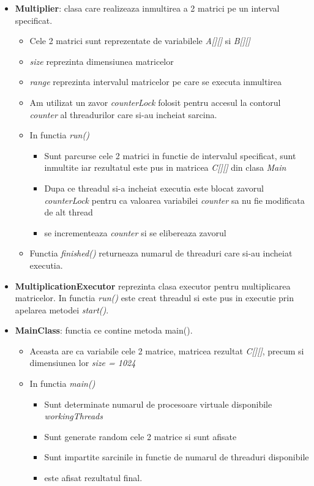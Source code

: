 \documentclass{article}
\begin{document}
\begin{itemize}
    \item \textbf{Multiplier}: clasa care realizeaza inmultirea a 2 matrici pe un interval specificat.
        \begin{itemize}
            \item Cele 2 matrici sunt reprezentate de variabilele \textit{A[][]} si \textit{B[][]} \item \textit{size} reprezinta dimensiunea matricelor
            \item \textit{range} reprezinta intervalul matricelor pe care se executa inmultirea
            \item Am utilizat un zavor \textit{counterLock} folosit pentru accesul la contorul \textit{counter} al threadurilor care si-au incheiat sarcina.
            \item In functia \textit{run()} 
            \begin{itemize}
                \item Sunt parcurse cele 2 matrici in functie de intervalul specificat, sunt inmultite iar rezultatul este pus in matricea \textit{C[][]} din clasa \textit{Main}
                \item Dupa ce threadul si-a incheiat executia este blocat zavorul \textit{counterLock} pentru ca valoarea variabilei \textit{counter} sa nu fie modificata de alt thread
                \item se incrementeaza \textit{counter} si se elibereaza zavorul
            \end{itemize}
        \item Functia \textit{finished()} returneaza numarul de threaduri care si-au incheiat executia.
        \end{itemize}
    \item \textbf{MultiplicationExecutor} reprezinta clasa executor pentru multiplicarea matricelor. In functia \textit{run()} este creat threadul si este pus in executie prin apelarea metodei \textit{start()}.
    \item \textbf{MainClass}: functia ce contine metoda main().
        \begin{itemize}
            \item Aceasta are ca variabile cele 2 matrice, matricea rezultat \textit{C[][]}, precum si dimensiunea lor \textit{size = 1024} 
            \item In functia \textit{main()} 
            \begin{itemize}
                \item Sunt determinate numarul de procesoare virtuale disponibile \textit{workingThreads}
                \item Sunt generate random cele 2 matrice si sunt afisate
                \item Sunt impartite sarcinile in functie de numarul de threaduri disponibile
                \item este afisat rezultatul final.
            \end{itemize}
        \end{itemize}
\end{itemize}
\end{document}
